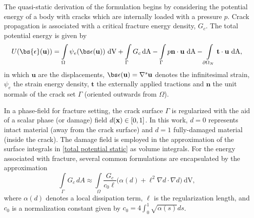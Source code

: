 The quasi-static derivation of the formulation begins by considering the potential energy of a body with cracks which are internally loaded with a pressure $p$.  Crack propagation is associated with a critical fracture energy density, $G_c$.  The total potential energy is given by
\begin{equation}\label{total potential static}
    U(\bs{\epsilon}(\textbf{u})) = \int\limits_{\Omega}\psi_e(\bs\epsilon(\textbf{u}))\ \text{dV} + \int\limits_{\Gamma} G_c \, \text{dA} - \int\limits_{\Gamma} p\textbf{n}\cdot\textbf{u}\ \text{dA} - \int\limits_{\partial \Omega_N} \textbf{t}\cdot\textbf{u} \ \text{dA},
\end{equation}
in which $\textbf{u}$ are the displacements, $\bs \epsilon(\textbf{u}) = \nabla^s\textbf{u}$ denotes the infinitesimal strain, $\psi_e$ the strain energy density, $\textbf{t}$ the externally applied tractions and $\textbf{n}$ the unit normals of the crack set $\Gamma$ (oriented outwards from $\Omega$).  

In a phase-field for fracture setting, the crack surface $\Gamma$ is regularized with the aid of a scalar phase (or damage) field $d ({\bf{x}}) \in[0,1]$.  In this work, $d = 0$  represents intact material (away from the crack surface) and $d=1$ fully-damaged material (inside the crack).  The damage field is employed in the approximation of the surface integrals in \eqref{total potential static} as volume integrals.  For the energy associated with fracture, several common formulations are encapsulated by the approximation
\begin{equation}
    \int\limits_{\Gamma} G_c \, dA \approx  \int\limits_{\Omega} \dfrac{G_c}{c_0\ell}\bigg( \alpha(d) + \ell^2\nabla d \cdot \nabla d\bigg)\ \text{dV}, 
\end{equation}
where $\alpha(d)$ denotes a local dissipation term, $\ell$ is the regularization length, and $c_0$ is a normalization constant given by $c_0 = 4\int_0^1\sqrt{\alpha(s)}ds$.

